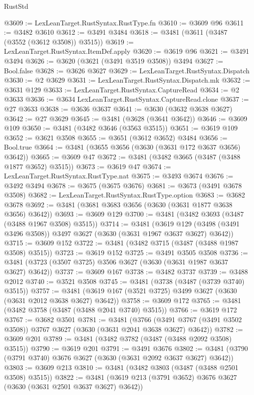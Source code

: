 \begin{lexlean}{RustStd}
\begin{coremodule}
@3609 := LexLeanTarget.RustSyntax.RustType.fn
@3610 := @3609 @96
@3611 := @3482 @3610
@3612 := @3491 @3484
@3618 := @3481 (@3611 (@3487 (@3552 (@3612 @3508)) @3515))
@3619 := LexLeanTarget.RustSyntax.ItemDef.apply
@3620 := @3619 @96
@3621 := @3491 @3494
@3626 := @3620 (@3621 (@3491 @3519 @3508)) @3494
@3627 := Bool.false
@3628 := @3626 @3627
@3629 := LexLeanTarget.RustSyntax.Dispatch
@3630 := @2 @3629
@3631 := LexLeanTarget.RustSyntax.Dispatch.mk
@3632 := @3631 @129
@3633 := LexLeanTarget.RustSyntax.CaptureRead
@3634 := @2 @3633
@3636 := @3634 LexLeanTarget.RustSyntax.CaptureRead.clone
@3637 := @27 @3633
@3638 := @3636 @3637
@3641 := @3630 (@3632 @3638 @3627)
@3642 := @27 @3629
@3645 := @3481 (@3628 (@3641 @3642))
@3646 := @3609 @109
@3650 := @3481 (@3482 @3646 (@3563 @3515))
@3651 := @3619 @109
@3652 := @3621 @3508
@3655 := @3651 (@3612 @3652) @3484
@3656 := Bool.true
@3664 := @3481 (@3655 @3656 (@3630 (@3631 @172 @3637 @3656) @3642))
@3665 := @3609 @47
@3672 := @3481 (@3482 @3665 (@3487 (@3488 @1877 @3652) @3515))
@3673 := @3619 @47
@3674 := LexLeanTarget.RustSyntax.RustType.nat
@3675 := @3493 @3674
@3676 := @3492 @3494
@3678 := @3675 (@3675 @3676)
@3681 := @3673 (@3491 @3678 @3508)
@3682 := LexLeanTarget.RustSyntax.RustType.option
@3683 := @3682 @3678
@3692 := @3481 (@3681 @3683 @3656 (@3630 (@3631 @1877 @3638 @3656) @3642))
@3693 := @3609 @129
@3700 := @3481 (@3482 @3693 (@3487 (@3488 @1967 @3508) @3515))
@3714 := @3481
    (@3619 @129 (@3498 (@3491 @3496 @3508)) @3497 @3627 (@3630 (@3631 @1967 @3637 @3627) @3642))
@3715 := @3609 @152
@3722 := @3481 (@3482 @3715 (@3487 (@3488 @1987 @3508) @3515))
@3723 := @3619 @152
@3725 := @3491 @3505 @3508
@3736 := @3481 (@3723 (@3507 @3725) @3506 @3627 (@3630 (@3631 @1987 @3637 @3627) @3642))
@3737 := @3609 @167
@3738 := @3482 @3737
@3739 := @3488 @2012
@3740 := @3521 @3508
@3745 := @3481 (@3738 (@3487 (@3739 @3740) @3515))
@3757 := @3481 (@3619 @167 (@3521 @3725) @3499 @3627 (@3630 (@3631 @2012 @3638 @3627) @3642))
@3758 := @3609 @172
@3765 := @3481 (@3482 @3758 (@3487 (@3488 @2041 @3740) @3515))
@3766 := @3619 @172
@3767 := @3682 @3501
@3781 := @3481
    (@3766 (@3491 @3767 (@3491 @3502 @3508)) @3767 @3627 (@3630 (@3631 @2041 @3638 @3627) @3642))
@3782 := @3609 @201
@3789 := @3481 (@3482 @3782 (@3487 (@3488 @2092 @3508) @3515))
@3790 := @3619 @201
@3791 := @3491 @3676
@3802 := @3481 (@3790 (@3791 @3740) @3676 @3627 (@3630 (@3631 @2092 @3637 @3627) @3642))
@3803 := @3609 @213
@3810 := @3481 (@3482 @3803 (@3487 (@3488 @2501 @3508) @3515))
@3822 := @3481 (@3619 @213 (@3791 @3652) @3676 @3627 (@3630 (@3631 @2501 @3637 @3627) @3642))

\end{coremodule}
\end{lexlean}
